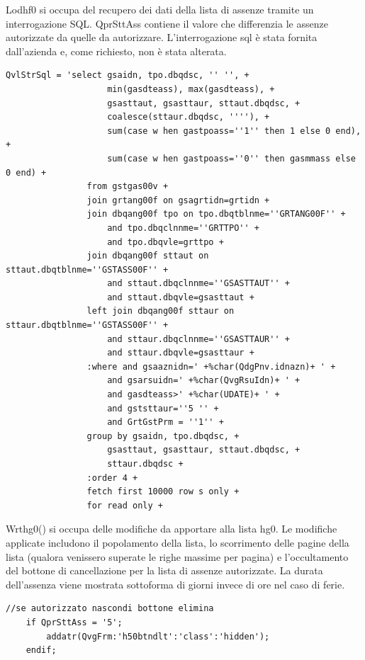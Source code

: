 \documentclass[target=bach,aauheader=,style=]{thud}
\begin{document}
Lodhf0 si occupa del recupero dei dati della lista di assenze tramite un interrogazione SQL. 
QprSttAss contiene il valore che differenzia le assenze autorizzate da quelle da autorizzare.
L'interrogazione sql è stata fornita dall'azienda e, come richiesto, non è stata alterata.
\begin{lstlisting}[language=RPG, caption=Codice RPG per la costruzione dell'interrogazione SQL]
    QvlStrSql = 'select gsaidn, tpo.dbqdsc, '' '', +
                    min(gasdteass), max(gasdteass), +
                    gsasttaut, gsasttaur, sttaut.dbqdsc, +
                    coalesce(sttaur.dbqdsc, ''''), +
                    sum(case w hen gastpoass=''1'' then 1 else 0 end), +
                    sum(case w hen gastpoass=''0'' then gasmmass else 0 end) +
                from gstgas00v +
                join grtang00f on gsagrtidn=grtidn +
                join dbqang00f tpo on tpo.dbqtblnme=''GRTANG00F'' +
                    and tpo.dbqclnnme=''GRTTPO'' +
                    and tpo.dbqvle=grttpo +
                join dbqang00f sttaut on sttaut.dbqtblnme=''GSTASS00F'' +
                    and sttaut.dbqclnnme=''GSASTTAUT'' +
                    and sttaut.dbqvle=gsasttaut +
                left join dbqang00f sttaur on sttaur.dbqtblnme=''GSTASS00F'' +
                    and sttaur.dbqclnnme=''GSASTTAUR'' +
                    and sttaur.dbqvle=gsasttaur +
                :where and gsaaznidn=' +%char(QdgPnv.idnazn)+ ' +
                    and gsarsuidn=' +%char(QvgRsuIdn)+ ' +
                    and gasdteass>' +%char(UDATE)+ ' +
                    and gststtaur=''5 '' +
                    and GrtGstPrm = ''1'' +
                group by gsaidn, tpo.dbqdsc, +
                    gsasttaut, gsasttaur, sttaut.dbqdsc, +
                    sttaur.dbqdsc +
                :order 4 +
                fetch first 10000 row s only +
                for read only +
\end{lstlisting}

\break
Wrthg0() si occupa delle modifiche da apportare alla lista hg0.
Le modifiche applicate includono il popolamento della lista, lo scorrimento delle pagine della lista (qualora venissero superate le righe massime per pagina) 
e l'occultamento del bottone di cancellazione per la lista di assenze autorizzate.
La durata dell'assenza viene mostrata sottoforma di giorni invece di ore nel caso di ferie.

\begin{lstlisting}[language=RPG, caption=Codice RPG di occultamento del bottone elimina(h50btndlt), label=lst:rpglodhf0gsa081]
    //se autorizzato nascondi bottone elimina
    if QprSttAss = '5';
        addatr(QvgFrm:'h50btndlt':'class':'hidden');
    endif; 
\end{lstlisting}
\end{document}
